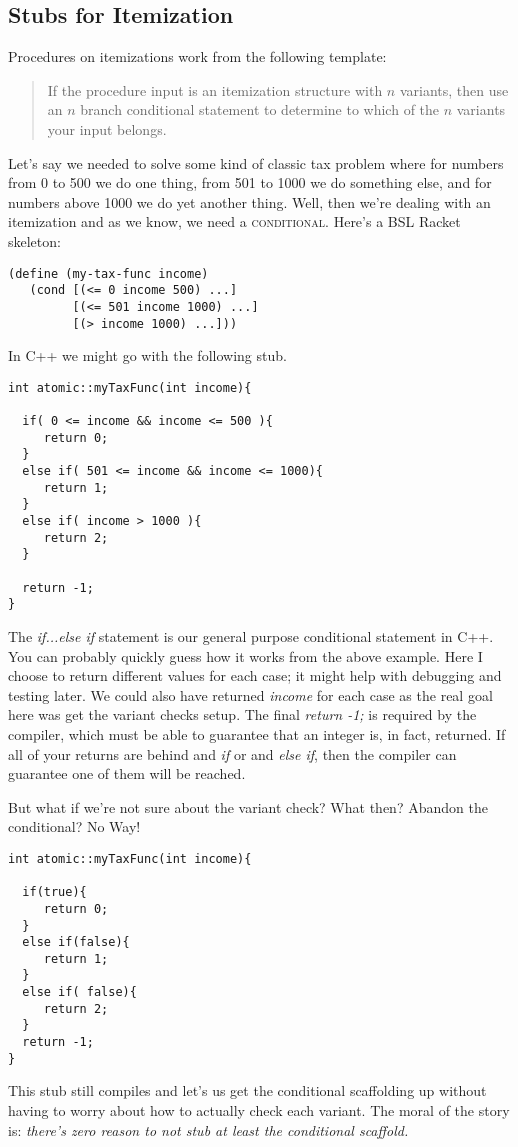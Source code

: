 \documentclass[]{tufte-handout}
\begin{document}
\subsection{Stubs for Itemization}

Procedures on itemizations work from the following template:
\begin{quote}
If the procedure input is an itemization structure with $n$ variants, then use an $n$ branch conditional statement to determine to which of the $n$ variants your input belongs.
\end{quote}

Let's say we needed to solve some kind of classic tax problem where for numbers from 0 to 500 we do one thing, from 501 to 1000 we do something else, and for numbers above 1000 we do yet another thing. Well, then we're dealing with an itemization and as we know, we need a \textsc{conditional}.  Here's a BSL Racket skeleton:
\begin{verbatim}
(define (my-tax-func income)
   (cond [(<= 0 income 500) ...]
         [(<= 501 income 1000) ...]
         [(> income 1000) ...]))
\end{verbatim}

In C++ we might go with the following stub.
\begin{verbatim}
int atomic::myTaxFunc(int income){
  
  if( 0 <= income && income <= 500 ){
     return 0;
  }
  else if( 501 <= income && income <= 1000){
     return 1;
  }
  else if( income > 1000 ){
     return 2;
  }

  return -1;
}
\end{verbatim}
The \textit{if...else if} statement is our general purpose conditional statement in C++. You can probably quickly guess how it works from the above example. Here I choose to return different values for each case; it might help with debugging and testing later. We could also have returned \textit{income} for each case as the real goal here was get the variant checks setup. The final \textit{return -1;} is required by the compiler, which must be able to guarantee that an integer is, in fact, returned.  If all of your returns are behind and \textit{if} or and \textit{else if}, then the compiler can guarantee one of them will be reached.

But what if we're not sure about the variant check? What then? Abandon the conditional? No Way!
\begin{verbatim}
int atomic::myTaxFunc(int income){
  
  if(true){
     return 0;
  }
  else if(false){
     return 1;
  }
  else if( false){
     return 2;
  }
  return -1;
}
\end{verbatim}
This stub still compiles and let's us get the conditional scaffolding up without having to worry about how to actually check each variant.  The moral of the story is: \textit{there's zero reason to not stub at least the conditional scaffold. }
\end{document}
